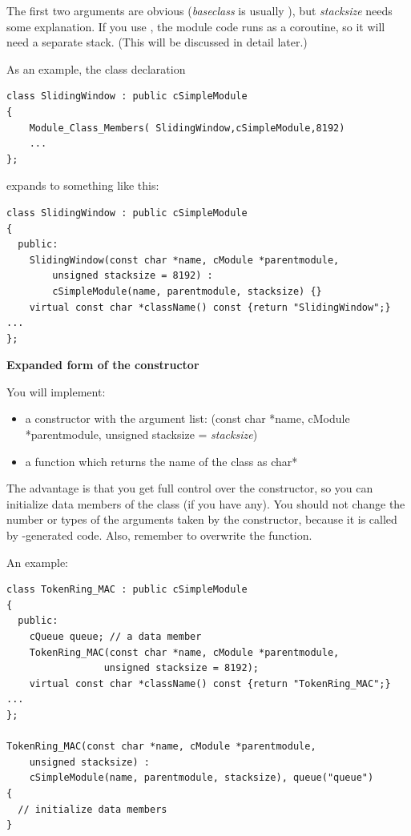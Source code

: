 The first two arguments are obvious (\textit{baseclass} is usually ), 
but \textit{stacksize} needs some explanation. If you use , 
the module code runs as a coroutine, so it will need a separate 
stack. (This will be discussed in detail later.)


As an example, the class declaration

\begin{Verbatim}
class SlidingWindow : public cSimpleModule
{
    Module_Class_Members( SlidingWindow,cSimpleModule,8192)
    ...
};
\end{Verbatim}


expands to something like this:

\begin{Verbatim}
class SlidingWindow : public cSimpleModule
{
  public:
    SlidingWindow(const char *name, cModule *parentmodule,
        unsigned stacksize = 8192) :
        cSimpleModule(name, parentmodule, stacksize) {}
    virtual const char *className() const {return "SlidingWindow";}
...
};
\end{Verbatim}

\textbf{Expanded form of the constructor}


You will implement:
\begin{itemize}
\item{a constructor with the argument list: (const
    char *name, cModule *parentmodule, unsigned stacksize =
    \textit{stacksize})}
\item{a  function which returns the name of the
    class as char*}
\end{itemize}

The advantage is that you get full control over the constructor, 
so you can initialize data members of the class (if you have 
any). You should not change the number or types of the arguments 
taken by the constructor, because it is called by {\opp}-generated 
code. Also, remember to overwrite the  function.


An example:

\begin{Verbatim}
class TokenRing_MAC : public cSimpleModule
{
  public:
    cQueue queue; // a data member
    TokenRing_MAC(const char *name, cModule *parentmodule,
                 unsigned stacksize = 8192);
    virtual const char *className() const {return "TokenRing_MAC";}
...
};

TokenRing_MAC(const char *name, cModule *parentmodule,
    unsigned stacksize) :
    cSimpleModule(name, parentmodule, stacksize), queue("queue") 
{
  // initialize data members
}
\end{Verbatim}


